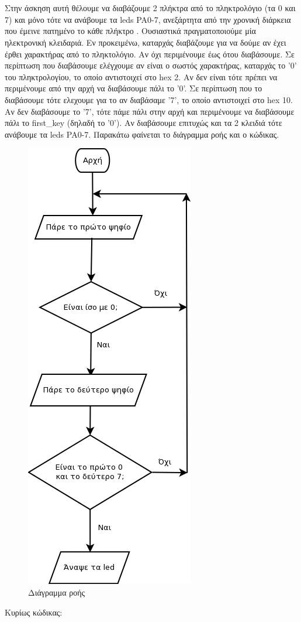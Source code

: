 \section{}

Στην άσκηση αυτή θέλουμε να διαβάζουμε 2 πλήκτρα από το πληκτρολόγιο (τα 0 και
7) και μόνο τότε να ανάβουμε τα leds PA0-7, ανεξάρτητα από την χρονική
διάρκεια που έμεινε πατημένο το κάθε πλήκτρο . Ουσιαστικά πραγματοποιούμε μία
ηλεκτρονική κλειδαριά.  Εν προκειμένω, καταρχάς διαβάζουμε για να δούμε αν
έχει έρθει χαρακτήρας από το πληκτολόγιο. Αν όχι περιμένουμε έως ότου
διαβάσουμε.  Σε περίπτωση που διαβάσουμε ελέγχουμε αν είναι ο σωστός
χαρακτήρας, καταρχάς το '0' του πληκτρολογίου, το οποίο αντιστοιχεί στο hex 2.
Αν δεν είναι τότε πρέπει να περιμένουμε από την αρχή να διαβάσουμε πάλι το
'0'. Σε περίπτωση που το διαβάσουμε τότε ελεχουμε για το αν διαβάσαμε '7', το
οποίο αντιστοιχεί στο hex 10. Αν δεν διαβάσουμε το '7', τότε πάμε πάλι στην
αρχή και περιμένουμε να διαβάσουμε πάλι το first\_key (δηλαδή το '0').  Αν
διαβάσουμε επιτυχώς και τα 2 κλειδιά τότε ανάβουμε τα leds PA0-7. Παρακάτω
φαίνεται το διάγραμμα ροής και ο κώδικας.

\begin{figure}[H]
	\centering
	\includegraphics[height=0.5\textheight]{files/flowchart.png}
	\caption{Διάγραμμα ροής}
\end{figure}

\noindent Κυρίως κώδικας:
\inputminted[linenos,obeytabs,fontsize=\footnotesize]{c}{files/part3.S}
